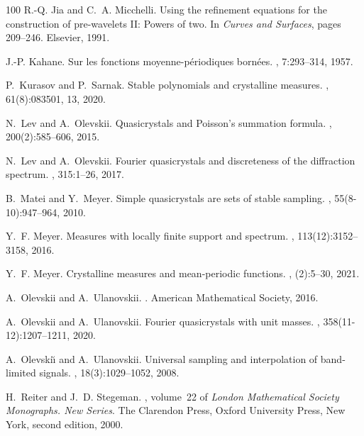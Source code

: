 \documentclass[12pt]{amsart}
\numberwithin{equation}{section}
\begin{document}
\begin{thebibliography}{100}
R.-Q. Jia and C.~A. Micchelli.
\newblock Using the refinement equations for the construction of pre-wavelets {II}: Powers of two.
\newblock In {\em Curves and Surfaces}, pages 209--246. Elsevier, 1991.

J.-P. Kahane.
\newblock Sur les fonctions moyenne-p\'eriodiques born\'ees.
, 7:293--314, 1957.

P.~Kurasov and P.~Sarnak.
\newblock Stable polynomials and crystalline measures.
, 61(8):083501, 13, 2020.

N.~Lev and A.~Olevskii.
\newblock Quasicrystals and {P}oisson's summation formula.
, 200(2):585--606, 2015.

N.~Lev and A.~Olevskii.
\newblock Fourier quasicrystals and discreteness of the diffraction spectrum.
, 315:1--26, 2017.

B.~Matei and Y.~Meyer.
\newblock Simple quasicrystals are sets of stable sampling.
, 55(8-10):947--964, 2010.

Y.~F. Meyer.
\newblock Measures with locally finite support and spectrum.
, 113(12):3152--3158, 2016.

Y.~F. Meyer.
\newblock Crystalline measures and mean-periodic functions.
, (2):5--30, 2021.

A.~Olevskii and A.~Ulanovskii.
.
\newblock American Mathematical Society, 2016.

A.~Olevskii and A.~Ulanovskii.
\newblock Fourier quasicrystals with unit masses.
, 358(11-12):1207--1211, 2020.

A.~Olevski\u{\i} and A.~Ulanovskii.
\newblock Universal sampling and interpolation of band-limited signals.
, 18(3):1029--1052, 2008.

H.~Reiter and J.~D. Stegeman.
, volume~22 of {\em London Mathematical Society Monographs. New Series}.
\newblock The Clarendon Press, Oxford University Press, New York, second edition, 2000.


\end{thebibliography}
\end{document}
